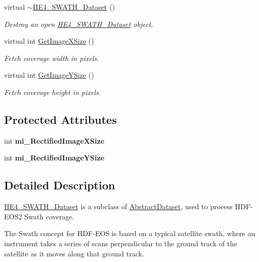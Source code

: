 \begin{DoxyCompactItemize}
virtual \hyperlink{classHE4__SWATH__Dataset_a084f204e8cd2c7401b84bbd6aa98fd94}{$\sim$HE4\_\-SWATH\_\-Dataset} ()
\begin{DoxyCompactList}\small\item\em Destroy an open \hyperlink{classHE4__SWATH__Dataset}{HE4\_\-SWATH\_\-Dataset} object. \end{DoxyCompactList}\item 
virtual int \hyperlink{classHE4__SWATH__Dataset_acbe2ea029124c791fc8fe2b9e68a8bf8}{GetImageXSize} ()
\begin{DoxyCompactList}\small\item\em Fetch coverage width in pixels. \end{DoxyCompactList}\item 
virtual int \hyperlink{classHE4__SWATH__Dataset_ab8450ad5ae44927bb8aef7dba5bc1af8}{GetImageYSize} ()
\begin{DoxyCompactList}\small\item\em Fetch coverage height in pixels. \end{DoxyCompactList}\end{DoxyCompactItemize}
\subsection*{Protected Attributes}
\begin{DoxyCompactItemize}
\item 
\hypertarget{classHE4__SWATH__Dataset_ae158131d053ed98cc48f8d8be3fe5481}{
int {\bfseries mi\_\-RectifiedImageXSize}}
\label{classHE4__SWATH__Dataset_ae158131d053ed98cc48f8d8be3fe5481}

\item 
\hypertarget{classHE4__SWATH__Dataset_a234f2289c231f9c4bb2fa181ab28220c}{
int {\bfseries mi\_\-RectifiedImageYSize}}
\label{classHE4__SWATH__Dataset_a234f2289c231f9c4bb2fa181ab28220c}

\end{DoxyCompactItemize}


\subsection{Detailed Description}
\hyperlink{classHE4__SWATH__Dataset}{HE4\_\-SWATH\_\-Dataset} is a subclass of \hyperlink{classAbstractDataset}{AbstractDataset}, used to process HDF-\/EOS2 Swath coverage. 

The Swath concept for HDF-\/EOS is based on a typical satellite swath, where an instrument takes a series of scans perpendicular to the ground track of the satellite as it moves along that ground track.

